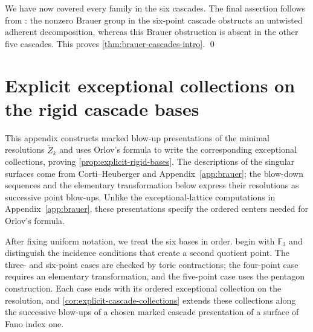 \documentclass[11pt]{article}
\theoremstyle{plain}
\theoremstyle{definition}
\theoremstyle{remark}
\newcommand{\F}{\mathbb F}
\begin{document}
We have now covered every family in the six cascades. The final assertion
follows from \cite[Corollary~4.8]{KKS2020}: the nonzero Brauer group in the
six-point cascade obstructs an untwisted adherent decomposition, whereas this
Brauer obstruction is absent in the other five cascades. This proves
\cref{thm:brauer-cascades-intro}. \qed


\section{Explicit exceptional collections on the rigid cascade bases}
\label{app:explicit-bases}

This appendix constructs marked blow-up presentations of the minimal
resolutions \(\widetilde Z_k\) and uses Orlov's formula to write the
corresponding exceptional collections, proving
\cref{prop:explicit-rigid-bases}.
The descriptions of the singular surfaces come from Corti--Heuberger and
Appendix~\ref{app:brauer}; the blow-down sequences and the elementary
transformation below express their resolutions as successive point blow-ups.
Unlike the exceptional-lattice computations in Appendix~\ref{app:brauer},
these presentations specify the ordered centers needed for Orlov's formula.

After fixing uniform notation, we treat the six bases in order.
 begin with \(\F_3\)
and distinguish the incidence conditions that create a second quotient
point. The three- and six-point cases are checked by toric contractions;
the four-point case requires an elementary transformation, and the
five-point case uses the pentagon construction. Each case ends with its
ordered exceptional collection on the resolution, and
\cref{cor:explicit-cascade-collections} extends these collections along the
successive blow-ups of a chosen marked cascade presentation of a surface
of Fano index one.
\end{document}
